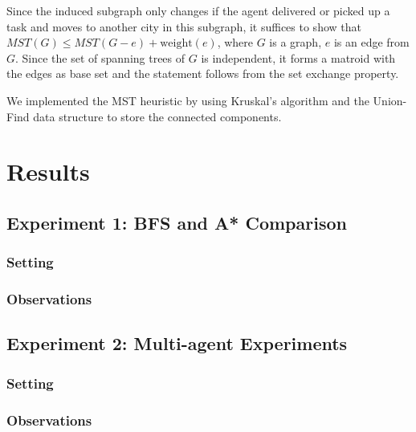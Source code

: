 \documentclass[11pt]{article}
\begin{document}
Since the induced subgraph only changes if the agent delivered or picked up a task and moves to another city in this subgraph, it suffices to show that $MST(G) \leq MST(G - e) + \mathrm{weight}(e)$, where $G$ is a graph, $e$ is an edge from $G$.
Since the set of spanning trees of $G$ is independent, it forms a matroid with the edges as base set and the statement follows from the set exchange property.

We implemented the MST heuristic by using Kruskal's algorithm and the Union-Find data structure to store the connected components.


\section{Results}

\subsection{Experiment 1: BFS and A* Comparison}

\subsubsection{Setting}

\subsubsection{Observations}


\subsection{Experiment 2: Multi-agent Experiments}

\subsubsection{Setting}

\subsubsection{Observations}
\end{document}
